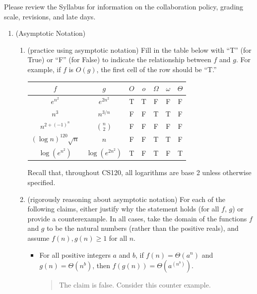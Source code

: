 \documentclass[11pt]{article}
\begin{document}

Please review the Syllabus for information on the collaboration policy, grading scale, revisions, and late days.


\begin{enumerate}
    \item (Asymptotic Notation) 
    \begin{enumerate}
    \item (practice using asymptotic notation)
        Fill in the table below with ``T'' (for True) or ``F'' (for False) to indicate the relationship between $f$ and $g$. For example, if $f$ is $O(g)$, the first cell of the row should be ``T.'' \\
        \begin{table}[h!]
        \centering
        \bgroup
        \def\arraystretch{1.3}
        \begin{tabular}{||c | c || c | c | c | c | c ||}
         \hline
         $f$ & $g$ & $O$ & $o$ & $\Omega$ & $\omega$ & $\Theta$ \\
         \hline\hline
         $e^{n^2}$ & $e^{2n^2}$ & T & T & F & F & F \\ \hline
         $n^3$ & $n^{3/n}$ & F & F & T & T & F \\ \hline
         $n^{2+(-1)^n}$ & $\binom{n}{2}$ & F & F & F & F & F \\ \hline
         $(\log {n})^{120}\sqrt{n}$ & $n$ & F & F & T & T & F \\ \hline
         $\log(e^{n^2})$ & $\log(e^{2n^2})$ & T & F & T & F & T \\ \hline
        \end{tabular}
        \egroup
        \end{table}
        Recall that, throughout CS120, all logarithms are base 2 unless otherwise specified. 
        
    \item  (rigorously reasoning about asymptotic notation)  
    For each of the following claims, either justify why the statement holds (for all $f$, $g$) or provide a counterexample. In all cases, take the domain of the functions $f$ and $g$ to be the natural numbers (rather than the positive reals), and assume $f(n), g(n)\geq 1$ for all $n$.
    \begin{itemize}
        \item For all positive integers $a$ and $b$, if $f(n) = \Theta(a^n)$ and $g(n) = \Theta(n^b)$, then $f(g(n)) = \Theta(a^{(n^b)})$.
        \begin{quote}
            \color{purple}
            The claim is false. Consider this counter example.


\end{quote}
\end{itemize}
\end{enumerate}
\end{enumerate}
\end{document}
